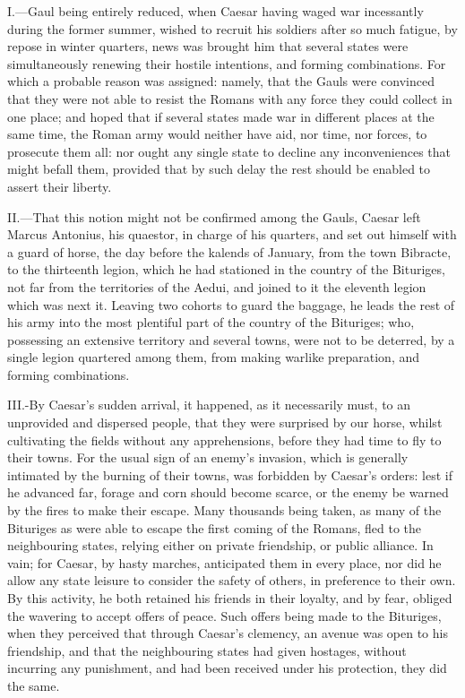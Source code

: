 I.—Gaul being entirely reduced, when Caesar having waged war
incessantly during the former summer, wished to recruit his soldiers
after so much fatigue, by repose in winter quarters, news was brought
him that several states were simultaneously renewing their hostile
intentions, and forming combinations. For which a probable reason was
assigned: namely, that the Gauls were convinced that they were not able
to resist the Romans with any force they could collect in one place; and
hoped that if several states made war in different places at the same
time, the Roman army would neither have aid, nor time, nor forces, to
prosecute them all: nor ought any single state to decline any
inconveniences that might befall them, provided that by such delay the
rest should be enabled to assert their liberty.

II.—That this notion might not be confirmed among the Gauls, Caesar
left Marcus Antonius, his quaestor, in charge of his quarters, and set
out himself with a guard of horse, the day before the kalends of
January, from the town Bibracte, to the thirteenth legion, which he had
stationed in the country of the Bituriges, not far from the territories
of the Aedui, and joined to it the eleventh legion which was next it.
Leaving two cohorts to guard the baggage, he leads the rest of his army
into the most plentiful part of the country of the Bituriges; who,
possessing an extensive territory and several towns, were not to be
deterred, by a single legion quartered among them, from making warlike
preparation, and forming combinations.

III.-By Caesar's sudden arrival, it happened, as it necessarily must, to
an unprovided and dispersed people, that they were surprised by our
horse, whilst cultivating the fields without any apprehensions, before
they had time to fly to their towns. For the usual sign of an enemy's
invasion, which is generally intimated by the burning of their towns,
was forbidden by Caesar's orders: lest if he advanced far, forage and
corn should become scarce, or the enemy be warned by the fires to make
their escape. Many thousands being taken, as many of the Bituriges as
were able to escape the first coming of the Romans, fled to the
neighbouring states, relying either on private friendship, or public
alliance. In vain; for Caesar, by hasty marches, anticipated them in
every place, nor did he allow any state leisure to consider the safety
of others, in preference to their own. By this activity, he both
retained his friends in their loyalty, and by fear, obliged the wavering
to accept offers of peace. Such offers being made to the Bituriges, when
they perceived that through Caesar's clemency, an avenue was open to his
friendship, and that the neighbouring states had given hostages, without
incurring any punishment, and had been received under his protection,
they did the same.

